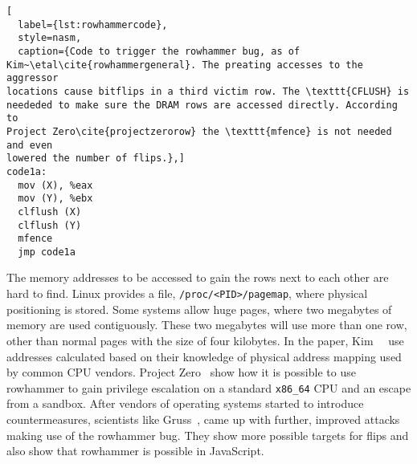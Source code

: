 \begin{minipage}{\linewidth}
\begin{lstlisting}[
  label={lst:rowhammercode},
  style=nasm,
  caption={Code to trigger the rowhammer bug, as of
Kim~\etal\cite{rowhammergeneral}. The preating accesses to the aggressor
locations cause bitflips in a third victim row. The \texttt{CFLUSH} is
neededed to make sure the DRAM rows are accessed directly. According to
Project Zero\cite{projectzerorow} the \texttt{mfence} is not needed and even
lowered the number of flips.},]
code1a:
  mov (X), %eax
  mov (Y), %ebx
  clflush (X)
  clflush (Y)
  mfence
  jmp code1a
\end{lstlisting}
\end{minipage}

The memory addresses to be accessed to gain the rows next to each other are hard
to find. Linux provides a file, \texttt{/proc/<PID>/pagemap}, where physical
positioning is stored. Some systems allow huge pages, where two megabytes of
memory are used contiguously. These two megabytes will use more than one row,
other than normal pages with the size of four kilobytes. In the paper,
Kim~\etal~\cite{rowhammergeneral} use addresses calculated based on their
knowledge of physical address mapping used by common CPU vendors. Project
Zero~\cite{projectzerorow} show how it is possible to use rowhammer to
gain privilege escalation on a standard \texttt{x86\_64} CPU and an escape from
a sandbox. After vendors of operating systems started to introduce
countermeasures, scientists like Gruss~\etal\cite{rowhammerjs, flipinthewall},
came up with further, improved attacks making use of the rowhammer bug. They
show more possible targets for flips and also show that rowhammer is possible in
JavaScript.


